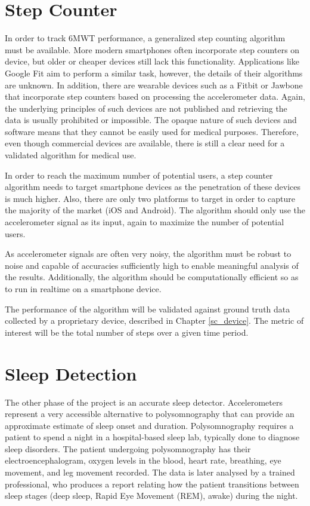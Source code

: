         \section{Step Counter}

            In order to track 6MWT performance, a generalized step counting algorithm must be available. More modern smartphones often incorporate step counters on device, but older or cheaper devices still lack this functionality. Applications like Google Fit aim to perform a similar task, however, the details of their algorithms are unknown. In addition, there are wearable devices such as a Fitbit or Jawbone that incorporate step counters based on processing the accelerometer data. Again, the underlying principles of such devices are not published and retrieving the data is usually prohibited or impossible. The opaque nature of such devices and software means that they cannot be easily used for medical purposes. Therefore, even though commercial devices are available, there is still a clear need for a validated algorithm for medical use.

            In order to reach the maximum number of potential users, a step counter algorithm needs to target smartphone devices as the penetration of these devices is much higher. Also, there are only two platforms to target in order to capture the majority of the market (iOS and Android). The algorithm should only use the accelerometer signal as its input, again to maximize the number of potential users.

            As accelerometer signals are often very noisy, the algorithm must be robust to noise and capable of accuracies sufficiently high to enable meaningful analysis of the results. Additionally, the algorithm should be computationally efficient so as to run in realtime on a smartphone device.

            The performance of the algorithm will be validated against ground truth data collected by a proprietary device, described in Chapter \ref{sc_device}. The metric of interest will be the total number of steps over a given time period.

        \section{Sleep Detection}

            The other phase of the project is an accurate sleep detector. Accelerometers represent a very accessible alternative to polysomnography that can provide an approximate estimate of sleep onset and duration. Polysomnography requires a patient to spend a night in a hospital-based sleep lab, typically done to diagnose sleep disorders. The patient undergoing polysomnography has their electroencephalogram, oxygen levels in the blood, heart rate, breathing, eye movement, and leg movement recorded. The data is later analysed by a trained professional, who produces a report relating how the patient transitions between sleep stages (deep sleep, Rapid Eye Movement (REM), awake) during the night.

